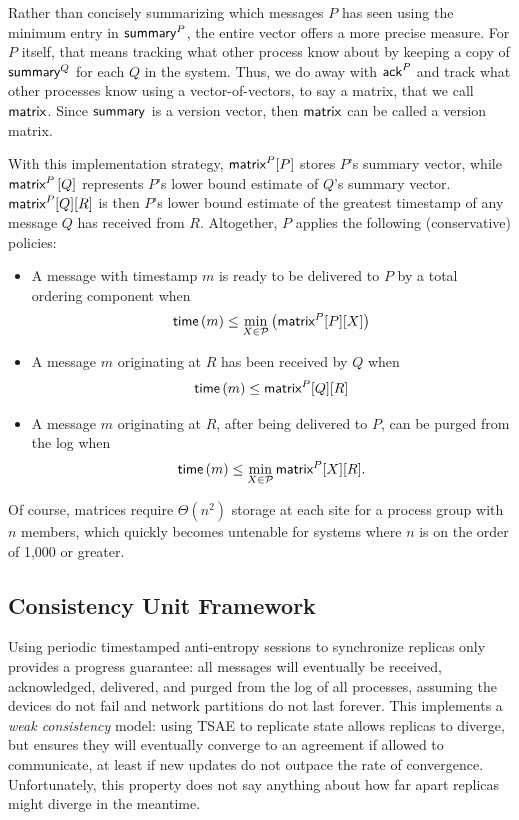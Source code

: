 \documentclass[]             %
{NASA}                       %
\theoremstyle{definition}
\begin{document}

Rather than concisely summarizing which messages $P$ has seen using
the minimum entry in $\textsf{summary}^{P}$, the entire vector offers a more
precise measure. For $P$ itself, that means tracking what other
process know about by keeping a copy of $\textsf{summary}^{Q}$ for each $Q$
in the system. Thus, we do away with $\textsf{ack}^{P}$ and track what other
processes know using a vector-of-vectors, to say a matrix, that we
call $\textsf{matrix}^{}$. Since $\textsf{summary}^{}$ is a version vector, then
$\textsf{matrix}^{}$ can be called a version matrix.

With this implementation strategy, $\textsf{matrix}^{P}[P]$ stores $P$'s
summary vector, while $\textsf{matrix}^{P}\left[Q\right]$ represents $P$'s
lower bound estimate of $Q$'s summary vector. $\textsf{matrix}^{P}[Q][R]$ is
then $P$'s lower bound estimate of the greatest timestamp of any
message $Q$ has received from $R$. Altogether, $P$ applies the
following (conservative) policies:
\begin{itemize}

\item A message with timestamp $m$ is ready to be delivered to $P$ by a total
  ordering component when
  \[\mathsf{time}\left(m\right) \leq \min_{X \in \mathcal{P}} \left(\textsf{matrix}^{P}[P][X]\right)\]
\item A message $m$ originating at $R$ has been
  received by $Q$ when
  \[ \mathsf{time}\left(m\right) \leq \textsf{matrix}^{P}[Q][R] \]
\item A message $m$ originating at $R$, after being delivered to $P$, can be purged from the log when
  \[ \mathsf{time}\left(m\right) \leq \min_{X \in \mathcal{P}}\textsf{matrix}^{P}[X][R].\]
\end{itemize}

Of course, matrices require $\Theta(n^2)$ storage at each site for a
process group with $n$ members, which quickly becomes untenable for
systems where $n$ is on the order of 1,000 or greater.

\subsection{Consistency Unit Framework}
\label{ssec:consistency-units}

Using periodic timestamped anti-entropy sessions to synchronize
replicas only provides a progress guarantee: all messages will
eventually be received, acknowledged, delivered, and purged from the
log of all processes, assuming the devices do not fail and network
partitions do not last forever. This implements a \emph{weak
  consistency} model: using TSAE to replicate state allows replicas to
diverge, but ensures they will eventually converge to an agreement if
allowed to communicate, at least if new updates do not outpace the
rate of convergence. Unfortunately, this property does not say
anything about how far apart replicas might diverge in the meantime.
\end{document}
